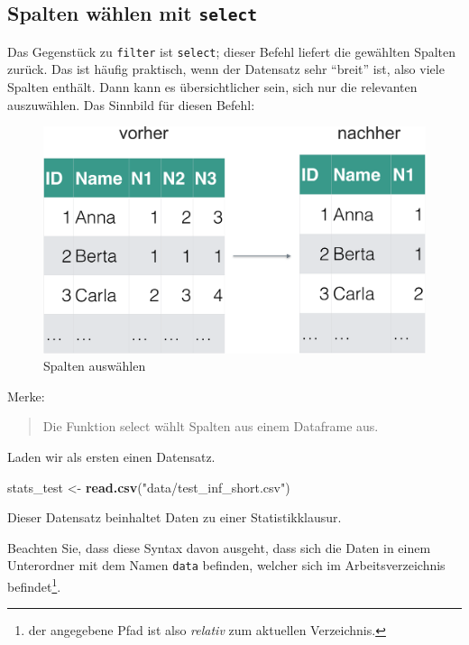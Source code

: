 \documentclass[12pt,ngerman,]{book}
\newenvironment{Shaded}{\begin{snugshade}}{\end{snugshade}}
\newcommand{\KeywordTok}[1]{\textcolor[rgb]{0.13,0.29,0.53}{\textbf{{#1}}}}
\newcommand{\StringTok}[1]{\textcolor[rgb]{0.31,0.60,0.02}{{#1}}}
\newcommand{\NormalTok}[1]{{#1}}
\let\rmarkdownfootnote\footnote%
\def\footnote{\protect\rmarkdownfootnote}
\renewenvironment{Shaded}{\begin{kframe}}{\end{kframe}}
\begin{document}
\subsection{\texorpdfstring{Spalten wählen mit
\texttt{select}}{Spalten wählen mit select}}\label{spalten-wahlen-mit-select}

Das Gegenstück zu \texttt{filter} ist
\texttt{select}; dieser Befehl liefert die
gewählten Spalten zurück. Das ist häufig praktisch, wenn der Datensatz
sehr ``breit'' ist, also viele Spalten enthält. Dann kann es
übersichtlicher sein, sich nur die relevanten auszuwählen. Das Sinnbild
für diesen Befehl:

\begin{figure}

{\centering \includegraphics[width=0.7\linewidth]{images/Datenjudo/select} 

}

\caption{Spalten auswählen}\label{fig:fig-select}
\end{figure}

Merke:

\begin{quote}
Die Funktion select wählt Spalten aus einem Dataframe aus.
\end{quote}

Laden wir als ersten einen Datensatz.

\begin{Shaded}
\begin{Highlighting}[]
\NormalTok{stats_test <-}\StringTok{ }\KeywordTok{read.csv}\NormalTok{(}\StringTok{"data/test_inf_short.csv"}\NormalTok{)}
\end{Highlighting}
\end{Shaded}

Dieser Datensatz beinhaltet Daten zu einer Statistikklausur.

Beachten Sie, dass diese Syntax davon ausgeht, dass sich die Daten in
einem Unterordner mit dem Namen \texttt{data} befinden, welcher sich im
Arbeitsverzeichnis befindet\footnote{der angegebene Pfad ist also
  \emph{relativ} zum aktuellen Verzeichnis.}.
\end{document}
